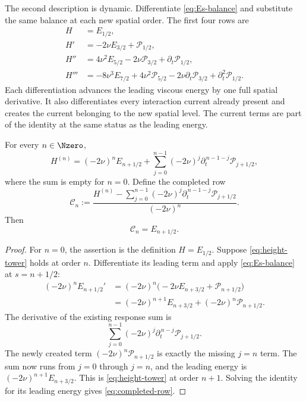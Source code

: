The second description is dynamic.  Differentiate
\eqref{eq:Es-balance} and substitute the same balance at each new spatial
order.  The first four rows are
\begin{align*}
 H
 &=E_{1/2},
 \\
 H'
 &=-2\nu E_{3/2}+\mathcal P_{1/2},
 \\
 H''
 &=4\nu^2E_{5/2}
   -2\nu\mathcal P_{3/2}
   +\partial_t\mathcal P_{1/2},
 \\
 H'''
 &=-8\nu^3E_{7/2}
   +4\nu^2\mathcal P_{5/2}
   -2\nu\partial_t\mathcal P_{3/2}
   +\partial_t^2\mathcal P_{1/2}.
\end{align*}
Each differentiation advances the leading viscous energy by one full spatial
derivative.  It also differentiates every interaction current already present
and creates the current belonging to the new spatial level.  The current terms
are part of the identity at the same status as the leading energy.

\begin{lemma}
\label{lem:height-tower}
For every \(n\in\Nzero\),
\begin{equation}
 H^{(n)}
 =(-2\nu)^nE_{n+1/2}
 +\sum_{j=0}^{n-1}(-2\nu)^j
   \partial_t^{\,n-1-j}\mathcal P_{j+1/2},
 \label{eq:height-tower}
\end{equation}
where the sum is empty for \(n=0\).  Define the completed row
\begin{equation}
 \mathscr C_n
 :=\frac{
 H^{(n)}
 -\displaystyle\sum_{j=0}^{n-1}(-2\nu)^j
   \partial_t^{\,n-1-j}\mathcal P_{j+1/2}}
 {(-2\nu)^n}.
 \label{eq:completed-row}
\end{equation}
Then
\begin{equation*}
 \mathscr C_n=E_{n+1/2}.
\end{equation*}
\end{lemma}

\begin{proof}
For \(n=0\), the assertion is the definition
\(H=E_{1/2}\).  Suppose \eqref{eq:height-tower} holds at order \(n\).
Differentiate its leading term and apply \eqref{eq:Es-balance} at
\(s=n+1/2\):
\begin{align*}
 (-2\nu)^nE_{n+1/2}'
 &=(-2\nu)^n
   \bigl(-2\nu E_{n+3/2}+\mathcal P_{n+1/2}\bigr)
 \\
 &=(-2\nu)^{n+1}E_{n+3/2}
   +(-2\nu)^n\mathcal P_{n+1/2}.
\end{align*}
The derivative of the existing response sum is
\begin{equation*}
 \sum_{j=0}^{n-1}(-2\nu)^j
 \partial_t^{\,n-j}\mathcal P_{j+1/2}.
\end{equation*}
The newly created term
\((-2\nu)^n\mathcal P_{n+1/2}\) is exactly the missing \(j=n\) term.  The
sum now runs from \(j=0\) through \(j=n\), and the leading energy is
\((-2\nu)^{n+1}E_{n+3/2}\).  This is
\eqref{eq:height-tower} at order \(n+1\).  Solving the identity for its
leading energy gives \eqref{eq:completed-row}.
\end{proof}

